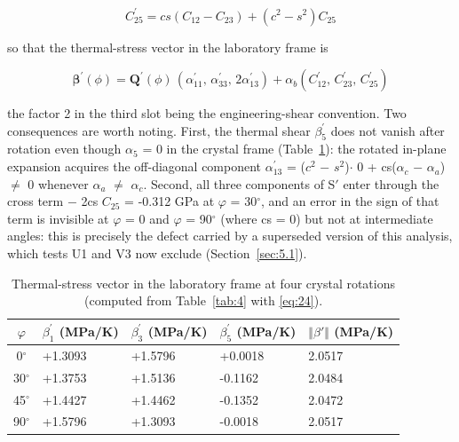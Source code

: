 \documentclass[preprint,12pt]{elsarticle}
\begin{document}
\begin{equation}
C^{\prime}_{25}=cs\left(C_{12}-C_{23}\right)+\left(c^2-s^2\right)C_{25} 
\label{eq:23}
\end{equation}

so that the thermal-stress vector in the laboratory frame is

\begin{equation}
\boldsymbol{\beta}^{\prime}(\phi)=\mathbf{Q}^{\prime}(\phi)\,\left(\alpha^{\prime}_{11},\,\alpha^{\prime}_{33},\,2\alpha^{\prime}_{13}\right)+\alpha_b\left(C^{\prime}_{12},\,C^{\prime}_{23},\,C^{\prime}_{25}\right) 
\label{eq:24}
\end{equation}

the factor 2 in the third slot being the engineering-shear convention. Two consequences are worth noting. First, the thermal shear $\beta^{\prime}_{5}$ does not vanish after rotation even though $\alpha_{5}$ = 0 in the crystal frame (Table~\ref{tab:3}): the rotated in-plane expansion acquires the off-diagonal component $\alpha^{\prime}_{13}$ = ($c^{2}$ $-$ $s^{2}$)$\cdot$ 0 + cs($\alpha_{c}$ $-$ $\alpha_{a}$) $\neq$ 0 whenever $\alpha_{a}$ $\neq$ $\alpha_{c}$. Second, all three components of S$'$ enter through the cross term $-$ 2cs $C_{25}$ = -0.312 GPa at $\varphi$ = 30$^{\circ}$, and an error in the sign of that term is invisible at $\varphi$ = 0 and $\varphi$ = 90$^{\circ}$ (where cs = 0) but not at intermediate angles: this is precisely the defect carried by a superseded version of this analysis, which tests U1 and V3 now exclude (Section~\ref{sec:5.1}).

\begin{table}[htbp]
\centering
\caption{Thermal-stress vector in the laboratory frame at four crystal rotations (computed from Table~\ref{tab:4} with \eqref{eq:24}).}
\label{tab:3}
\begin{tabular}{cllll}
\toprule
$\varphi$ & $\beta^{\prime}_{1}$ (MPa/K) & $\beta^{\prime}_{3}$ (MPa/K) & $\beta^{\prime}_{5}$ (MPa/K) & $\Vert \beta '\Vert$ (MPa/K) \\
\midrule
0$^{\circ}$ & +1.3093 & +1.5796 & +0.0018 & 2.0517 \\
30$^{\circ}$ & +1.3753 & +1.5136 & -0.1162 & 2.0484 \\
45$^{\circ}$ & +1.4427 & +1.4462 & -0.1352 & 2.0472 \\
90$^{\circ}$ & +1.5796 & +1.3093 & -0.0018 & 2.0517 \\
\bottomrule
\end{tabular}
\end{table}
\end{document}

